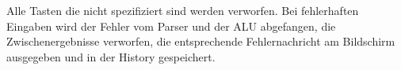 

Alle Tasten die nicht spezifiziert sind werden verworfen. Bei fehlerhaften Eingaben wird der Fehler vom Parser und der ALU abgefangen, die Zwischenergebnisse verworfen, die entsprechende Fehlernachricht am Bildschirm ausgegeben und in der History gespeichert.
